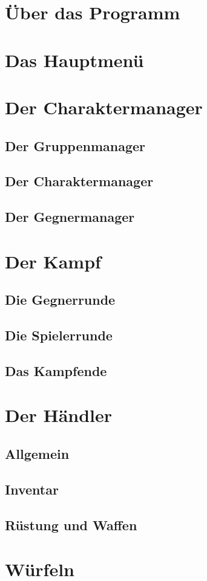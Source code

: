 \documentclass[11pt, a4paper, german]{article}
\begin{document}

\clearpage

\tableofcontents
\pagebreak

\section{Über das Programm}

\section{Das Hauptmenü}

\section{Der Charaktermanager}
\subsection{Der Gruppenmanager}
\subsection{Der Charaktermanager}
\subsection{Der Gegnermanager}

\section{Der Kampf}
\subsection{Die Gegnerrunde}
\subsection{Die Spielerrunde}
\subsection{Das Kampfende}

\section{Der Händler}
\subsection{Allgemein}
\subsection{Inventar}
\subsection{Rüstung und Waffen}

\section{Würfeln}
\end{document}
